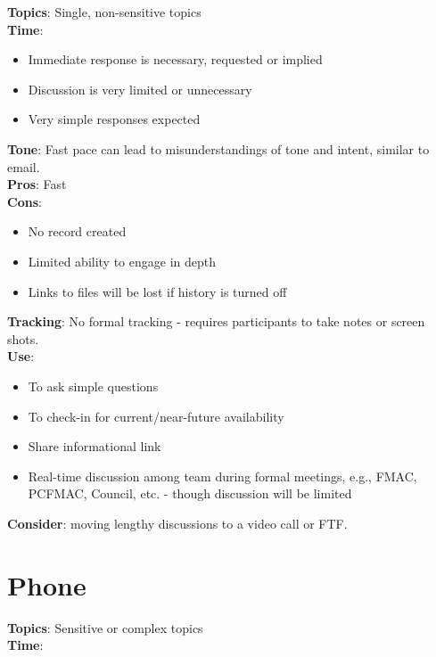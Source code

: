 \documentclass[
  letterpaper,
  DIV=11,
  numbers=noendperiod]{scrreprt}
\providecommand{\tightlist}{%
  \setlength{\itemsep}{0pt}\setlength{\parskip}{0pt}}\usepackage{longtable,booktabs,array}
\begin{document}
\textbf{Topics}: Single, non-sensitive topics\\
\textbf{Time}:

\begin{itemize}
\tightlist
\item
  Immediate response is necessary, requested or implied
\item
  Discussion is very limited or unnecessary
\item
  Very simple responses expected
\end{itemize}

\textbf{Tone}: Fast pace can lead to misunderstandings of tone and
intent, similar to email.\\
\textbf{Pros}: Fast\\
\textbf{Cons}:

\begin{itemize}
\tightlist
\item
  No record created\\
\item
  Limited ability to engage in depth\\
\item
  Links to files will be lost if history is turned off
\end{itemize}

\textbf{Tracking}: No formal tracking - requires participants to take
notes or screen shots.\\
\textbf{Use}:

\begin{itemize}
\tightlist
\item
  To ask simple questions\\
\item
  To check-in for current/near-future availability\\
\item
  Share informational link\\
\item
  Real-time discussion among team during formal meetings, e.g., FMAC,
  PCFMAC, Council, etc. - though discussion will be limited
\end{itemize}

\textbf{Consider}: moving lengthy discussions to a video call or FTF.

\hypertarget{phone}{%
\section{Phone}\label{phone}}

\textbf{Topics}: Sensitive or complex topics\\
\textbf{Time}:
\end{document}

